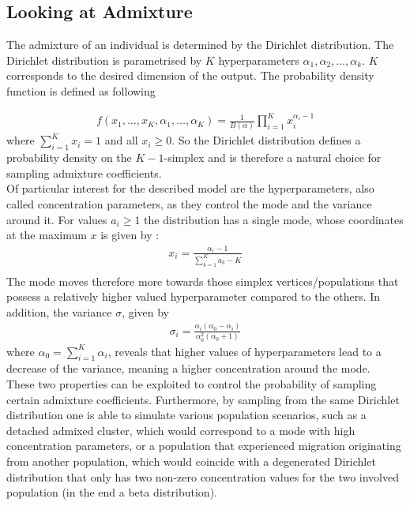 \documentclass[a4paper, 11pt]{article}
\begin{document}
\subsection{Looking at Admixture}
The admixture of an individual is determined by the Dirichlet distribution. The Dirichlet distribution is parametrised by $K$ hyperparameters $\alpha_1,\alpha_2, \ldots, \alpha_k$. $K$ corresponds to the desired dimension of the output. The probability density function is defined as following

\begin{align*}
f(x_1, \ldots, x_K, \alpha_1, \ldots, \alpha_K) = \frac{1}{B(\alpha)} \prod^{K}_{i=1}x_i^{\alpha_i-1}
\end{align*}
where $\sum^{K}_{i =1} x_i = 1$ and all $x_i \geq 0$. So the Dirichlet distribution defines a probability density on the $K-1$-simplex and is therefore a natural choice for sampling admixture coefficients. \\
Of particular interest for the described model are the hyperparameters, also called concentration parameters, as they control the mode and the variance around it. For values $a_i \geq 1$ the distribution has a single mode, whose coordinates at the maximum $x$ is given by \cite{bishop2006pattern}: 
\begin{align*}
x_i = \frac{\alpha_i - 1}{\sum^K_{k=1} a_k -K} \\
\end{align*}
The mode moves therefore more towards those simplex vertices/populations that possess a relatively higher valued hyperparameter compared to the others. In addition, the variance $\sigma$, given by 
\begin{align*}
\sigma_i = \frac{\alpha_i(\alpha_0 - \alpha_i)}{\alpha_0^2(\alpha_0 + 1)}
\end{align*} 
where $\alpha_0 = \sum^{K}_{i = 1} \alpha_i$, reveals that higher values of hyperparameters lead to a decrease of the variance, meaning a higher concentration around the mode. \\
These two properties can be exploited to control the probability of sampling certain admixture coefficients. Furthermore, by sampling from the same Dirichlet distribution one is able to simulate various population scenarios, such as a detached admixed cluster, which would correspond to a mode with high concentration parameters, or a population that experienced migration originating from another population, which would coincide with a degenerated Dirichlet distribution that only has two non-zero concentration values for the two involved population (in the end a beta distribution).
\end{document}
